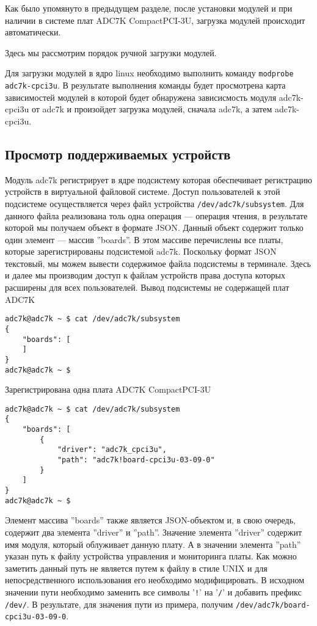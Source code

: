 \documentclass[a4paper]{article}
\begin{document}
Как было упомянуто в предыдущем разделе, после установки модулей и при наличии
в системе плат ADC7K \mbox{CompactPCI-3U}, загрузка модулей происходит автоматически.

Здесь мы рассмотрим порядок ручной загрузки модулей.

Для загрузки модулей в ядро linux необходимо выполнить команду \texttt{modprobe adc7k-cpci3u}.
В результате выполнения команды будет просмотрена карта зависимостей модулей в
которой будет обнаружена зависисмость модуля adc7k-cpci3u от adc7k и произойдет
загрузка модулей, сначала adc7k, а затем adc7k-cpci3u.

\subsection{Просмотр поддерживаемых устройств}

Модуль adc7k регистрирует в ядре подсистему которая обеспечивает регистрацию
устройств в виртуальной файловой системе. Доступ пользователей к этой подсистеме
осуществляется через файл устройства \texttt{/dev/adc7k/subsystem}. Для данного
файла реализована толь одна операция --- операция чтения, в результате которой
мы получаем объект в формате JSON. Данный объект содержит только один элемент ---
массив ''boards''. В этом массиве перечислены все платы, которые зарегистрированы
подсистемой adc7k. Поскольку формат JSON текстовый, мы можем вывести содержимое
файла подсистемы в терминале. Здесь и далее мы производим доступ к файлам
устройств права доступа которых расширены для всех пользователей.
Вывод подсистемы не содержащей плат ADC7K
\begin{small}\begin{verbatim}
adc7k@adc7k ~ $ cat /dev/adc7k/subsystem
{
    "boards": [
    ]
}
adc7k@adc7k ~ $
\end{verbatim}\end{small}
Зарегистрирована одна плата ADC7K \mbox{CompactPCI-3U}
\begin{small}\begin{verbatim}
adc7k@adc7k ~ $ cat /dev/adc7k/subsystem
{
    "boards": [
        {
            "driver": "adc7k_cpci3u",
            "path": "adc7k!board-cpci3u-03-09-0"
        }
    ]
}
adc7k@adc7k ~ $
\end{verbatim}\end{small}
Элемент массива ''boards'' также является JSON-объектом и, в свою очередь,
содержит два элемента ''driver'' и ''path''. Значение элемента ''driver''
содержит имя модуля, который облуживает данную плату. А в значении элемента
''path'' указан путь к файлу устройства управления и мониторинга платы. Как можно
заметить данный путь не является путем к файлу в стиле UNIX и для непосредственного
использования его необходимо модифицировать. В исходном значении пути необходимо
заменить все символы '\texttt{!}' на '\texttt{/}' и добавить префикс
\texttt{/dev/}. В результате, для значения пути из примера, получим
\texttt{/dev/adc7k/board-cpci3u-03-09-0}.
\end{document}
